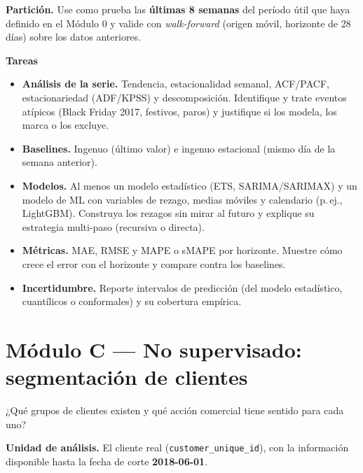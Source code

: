 \documentclass[11pt,letterpaper]{article}
\newcommand{\tabla}[1]{\texttt{#1}}
\begin{document}
\textbf{Partición.} Use como prueba las \textbf{últimas 8 semanas} del período útil que haya definido en el Módulo 0 y valide con \emph{walk-forward} (origen móvil, horizonte de 28 días) sobre los datos anteriores.

\textbf{Tareas}
\begin{itemize}
  \item \textbf{Análisis de la serie.} Tendencia, estacionalidad semanal, ACF/PACF, estacionariedad (ADF/KPSS) y descomposición. Identifique y trate eventos atípicos (Black Friday 2017, festivos, paros) y justifique si los modela, los marca o los excluye.
  \item \textbf{Baselines.} Ingenuo (último valor) e ingenuo estacional (mismo día de la semana anterior).
  \item \textbf{Modelos.} Al menos un modelo estadístico (ETS, SARIMA/SARIMAX) y un modelo de ML con variables de rezago, medias móviles y calendario (p.\,ej., LightGBM). Construya los rezagos sin mirar al futuro y explique su estrategia multi-paso (recursiva o directa).
  \item \textbf{Métricas.} MAE, RMSE y MAPE o sMAPE por horizonte. Muestre cómo crece el error con el horizonte y compare contra los baselines.
  \item \textbf{Incertidumbre.} Reporte intervalos de predicción (del modelo estadístico, cuantílicos o conformales) y su cobertura empírica.
\end{itemize}

\section{Módulo C — No supervisado: segmentación de clientes}

\begin{questionbox}
  ¿Qué grupos de clientes existen y qué acción comercial tiene sentido para cada uno?
\end{questionbox}

\textbf{Unidad de análisis.} El cliente real (\tabla{customer\_unique\_id}), con la información disponible hasta la fecha de corte \textbf{2018-06-01}.
\end{document}
